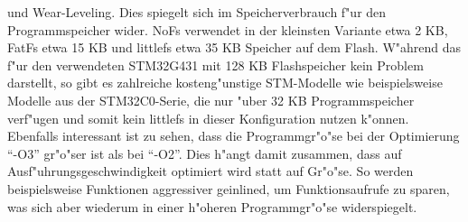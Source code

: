 \documentclass[11pt]{article}
\begin{document}
und Wear-Leveling. Dies spiegelt sich im Speicherverbrauch f"ur den Programmspeicher wider.
NoFs verwendet in der kleinsten Variante etwa 2 KB, FatFs etwa 15 KB und littlefs etwa 35 KB Speicher auf dem Flash.
W"ahrend das f"ur den verwendeten STM32G431 mit 128 KB Flashspeicher kein Problem darstellt, so
gibt es zahlreiche kosteng"unstige STM-Modelle wie beispielsweise Modelle aus der STM32C0-Serie,
die nur "uber 32 KB Programmspeicher verf"ugen und somit kein littlefs in dieser Konfiguration nutzen k"onnen. \\
Ebenfalls interessant ist zu sehen, dass die Programmgr"o"se bei der Optimierung \enquote{-O3} gr"o"ser ist als 
bei \enquote{-O2}. Dies h"angt damit zusammen, dass auf Ausf"uhrungsgeschwindigkeit optimiert wird statt auf Gr"o"se.
So werden beispielsweise Funktionen aggressiver geinlined, um Funktionsaufrufe zu sparen, was sich aber wiederum 
in einer h"oheren Programmgr"o"se widerspiegelt.
\end{document}
